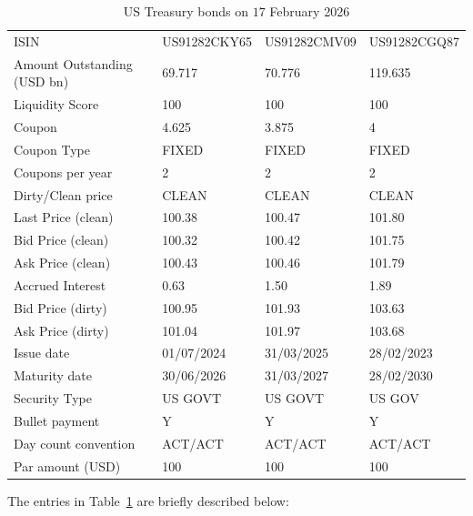 \documentclass[
  letterpaper,
  DIV=11,
  numbers=noendperiod]{scrreprt}
\begin{document}
\begin{longtable}[]{@{}llll@{}}
\caption{US Treasury bonds on \(17\) February
2026}\label{tbl-bonds}\tabularnewline
\toprule\noalign{}
\endfirsthead
\endhead
\bottomrule\noalign{}
\endlastfoot
ISIN & US91282CKY65 & US91282CMV09 & US91282CGQ87 \\
Amount Outstanding (USD bn) & 69.717 & 70.776 & 119.635 \\
Liquidity Score & 100 & 100 & 100 \\
Coupon & 4.625 & 3.875 & 4 \\
Coupon Type & FIXED & FIXED & FIXED \\
Coupons per year & 2 & 2 & 2 \\
Dirty/Clean price & CLEAN & CLEAN & CLEAN \\
Last Price (clean) & 100.38 & 100.47 & 101.80 \\
Bid Price (clean) & 100.32 & 100.42 & 101.75 \\
Ask Price (clean) & 100.43 & 100.46 & 101.79 \\
Accrued Interest & 0.63 & 1.50 & 1.89 \\
Bid Price (dirty) & 100.95 & 101.93 & 103.63 \\
Ask Price (dirty) & 101.04 & 101.97 & 103.68 \\
Issue date & 01/07/2024 & 31/03/2025 & 28/02/2023 \\
Maturity date & 30/06/2026 & 31/03/2027 & 28/02/2030 \\
Security Type & US GOVT & US GOVT & US GOV \\
Bullet payment & Y & Y & Y \\
Day count convention & ACT/ACT & ACT/ACT & ACT/ACT \\
Par amount (USD) & 100 & 100 & 100 \\
\end{longtable}

The entries in Table~\ref{tbl-bonds} are briefly described below:
\end{document}
